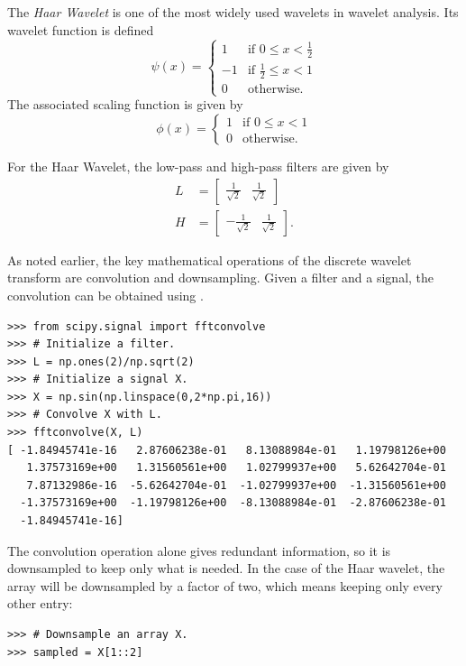 The \emph{Haar Wavelet} is one of the most widely used wavelets in wavelet analysis. Its wavelet function is defined
\[
\psi(x) =
 \begin{cases}
  1 & \text{if } 0 \leq x < \frac{1}{2} \\
  -1 & \text{if } \frac{1}{2} \leq x < 1 \\
  0 & \text{otherwise.}
 \end{cases}
\]
The associated scaling function is given by
\[
\phi(x) =
 \begin{cases}
 1 & \text{if } 0 \leq x < 1 \\
 0 & \text{otherwise.}
 \end{cases}
\]

For the Haar Wavelet, the low-pass and high-pass filters are given by
\begin{align*}
L &= \begin{bmatrix}\frac{1}{\sqrt{2}} & \frac{1}{\sqrt{2}}\end{bmatrix}\\
H &= \begin{bmatrix}-\frac{1}{\sqrt{2}} & \frac{1}{\sqrt{2}}\end{bmatrix}.
\end{align*}

As noted earlier, the key mathematical operations of the discrete wavelet transform are convolution and downsampling.
Given a filter and a signal, the convolution can be obtained using .
\begin{lstlisting}
>>> from scipy.signal import fftconvolve
>>> # Initialize a filter.
>>> L = np.ones(2)/np.sqrt(2)
>>> # Initialize a signal X.
>>> X = np.sin(np.linspace(0,2*np.pi,16))
>>> # Convolve X with L.
>>> fftconvolve(X, L)
[ -1.84945741e-16   2.87606238e-01   8.13088984e-01   1.19798126e+00
   1.37573169e+00   1.31560561e+00   1.02799937e+00   5.62642704e-01
   7.87132986e-16  -5.62642704e-01  -1.02799937e+00  -1.31560561e+00
  -1.37573169e+00  -1.19798126e+00  -8.13088984e-01  -2.87606238e-01
  -1.84945741e-16]
\end{lstlisting}

The convolution operation alone gives redundant information, so it is downsampled to keep only what is needed.
In the case of the Haar wavelet, the array will be downsampled by a factor of two, which means keeping only every other entry:
\begin{lstlisting}
>>> # Downsample an array X.
>>> sampled = X[1::2]
\end{lstlisting}

